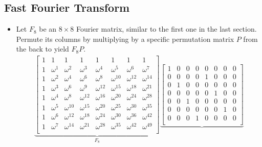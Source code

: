 \documentclass{article}
\begin{document}
\subsection*{Fast Fourier Transform}
\begin{itemize}
    \item {}Let $F_8$ be an $8\times 8$ Fourier matrix, similar to the first one in the last section. Permute its columns by multiplying by a specific permutation matrix $P$ from the back to yield $F_8P$.
    \begin{multline*}
        \underbrace{
            \begin{bmatrix}
                1 & 1 & 1 & 1 & 1 & 1 & 1 & 1\\
                1 & \omega^1 & \omega^2    & \omega^3    & \omega^4    & \omega^5    & \omega^6    & \omega^7   \\
                1 & \omega^2 & \omega^4    & \omega^6    & \omega^8    & \omega^{10} & \omega^{12} & \omega^{14}\\
                1 & \omega^3 & \omega^6    & \omega^9    & \omega^{12} & \omega^{15} & \omega^{18} & \omega^{21}\\
                1 & \omega^4 & \omega^8    & \omega^{12} & \omega^{16} & \omega^{20} & \omega^{24} & \omega^{28}\\
                1 & \omega^5 & \omega^{10} & \omega^{15} & \omega^{20} & \omega^{25} & \omega^{30} & \omega^{35}\\
                1 & \omega^6 & \omega^{12} & \omega^{18} & \omega^{24} & \omega^{30} & \omega^{36} & \omega^{42}\\
                1 & \omega^7 & \omega^{14} & \omega^{21} & \omega^{28} & \omega^{35} & \omega^{42} & \omega^{49}\\
            \end{bmatrix}
        }_{F_8} \underbrace{
            \begin{bmatrix}
                1 & 0 & 0 & 0 & 0 & 0 & 0 & 0\\
                0 & 0 & 0 & 0 & 1 & 0 & 0 & 0\\
                0 & 1 & 0 & 0 & 0 & 0 & 0 & 0\\
                0 & 0 & 0 & 0 & 0 & 1 & 0 & 0\\
                0 & 0 & 1 & 0 & 0 & 0 & 0 & 0\\
                0 & 0 & 0 & 0 & 0 & 0 & 1 & 0\\
                0 & 0 & 0 & 1 & 0 & 0 & 0 & 0\\

\end{bmatrix}}
\end{multline*}
\end{itemize}
\end{document}
